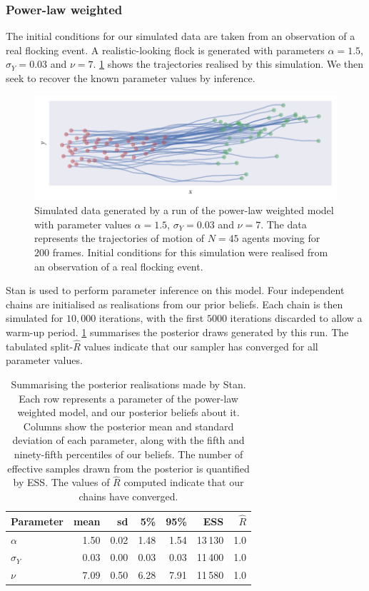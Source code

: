 \subsubsection{Power-law weighted}

The initial conditions for our simulated data are taken from an observation of a real
flocking event. A realistic-looking flock is generated with parameters $\alpha=1.5$,
$\sigma_Y=0.03$ and $\nu=7$. \cref{fig:power_sim} shows the trajectories realised
by this simulation. We then seek to recover the known parameter values by inference.
\begin{figure}[tbp]
  \includegraphics{power_sim.pdf}
  \caption{Simulated data generated by a run of the power-law weighted model with
    parameter values $\alpha=1.5$, $\sigma_Y=0.03$ and $\nu=7$. The data represents the
    trajectories of motion of $N=45$ agents moving for $200$ frames. Initial conditions
    for this simulation were realised from an observation of a real flocking event.}
  \label{fig:power_sim}
\end{figure}

Stan is used to perform parameter inference on this model. Four independent chains are
initialised as realisations from our prior beliefs. Each chain is then simulated for
$10,000$ iterations, with the first $5000$ iterations discarded to allow a warm-up period.
\cref{tab:power_summary} summarises the posterior draws generated by this run.
The tabulated split-$\widehat{R}$ values indicate that our sampler has converged for all
parameter values.

\begin{table}[p]
  \begin{tabular}{@{}lrrrrrr@{}}
    \toprule
    Parameter    & mean & sd   & 5\%  & 95\% & ESS     & $\widehat{R}$ \\
    \midrule
    $\alpha$     & 1.50 & 0.02 & 1.48 & 1.54 & 13\,130 & 1.0           \\
    $\sigma_{Y}$ & 0.03 & 0.00 & 0.03 & 0.03 & 11\,400 & 1.0           \\
    $\nu$        & 7.09 & 0.50 & 6.28 & 7.91 & 11\,580 & 1.0           \\
    \bottomrule
  \end{tabular}
  \caption{Summarising the posterior realisations made by Stan. Each row represents a
    parameter of the power-law weighted model, and our posterior beliefs about it.
    Columns show the posterior mean and standard deviation of each parameter, along with
    the fifth and ninety-fifth percentiles of our beliefs. The number of effective
    samples drawn from the posterior is quantified by ESS. The values of
    $\widehat{R}$ computed indicate that our chains have converged.}
  \label{tab:power_summary}
\end{table}

